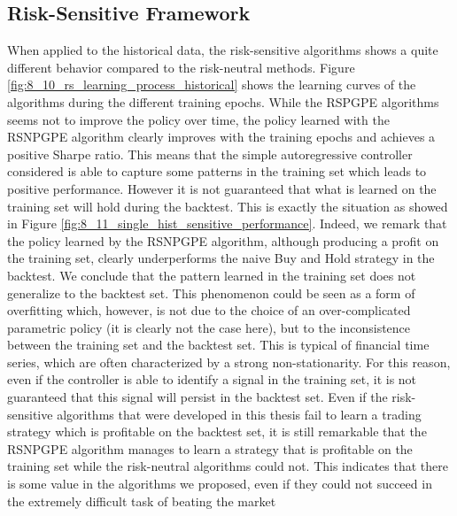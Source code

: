 \subsection{Risk-Sensitive Framework}
When applied to the historical data, the risk-sensitive algorithms shows a quite different behavior compared to the risk-neutral methods. Figure \ref{fig:8_10_rs_learning_process_historical} shows the learning curves of the algorithms during the different training epochs. While the RSPGPE algorithms seems not to improve the policy over time, the policy learned with the RSNPGPE algorithm clearly improves with the training epochs and achieves a positive Sharpe ratio. This means that the simple autoregressive controller considered is able to capture some patterns in the training set which leads to positive performance. However it is not guaranteed that what is learned on the training set will hold during the backtest. This is exactly the situation as showed in Figure \ref{fig:8_11_single_hist_sensitive_performance}. Indeed, we remark that the policy learned by the RSNPGPE algorithm, although producing a profit on the training set, clearly underperforms the naive Buy and Hold strategy in the backtest. We conclude that the pattern learned in the training set does not generalize to the backtest set. This phenomenon could be seen as a form of overfitting which, however, is not due to the choice of an over-complicated parametric policy (it is clearly not the case here), but to the inconsistence between the training set and the backtest set. This is typical of financial time series, which are often characterized by a strong non-stationarity. For this reason, even if the controller is able to identify a signal in the training set, it is not guaranteed that this signal will persist in the backtest set. Even if the risk-sensitive algorithms that were developed in this thesis fail to learn a trading strategy which is profitable on the backtest set, it is still remarkable that the RSNPGPE algorithm manages to learn a strategy that is profitable on the training set while the risk-neutral algorithms could not. This indicates that there is some value in the algorithms we proposed, even if they could not succeed in the extremely difficult task of beating the market

